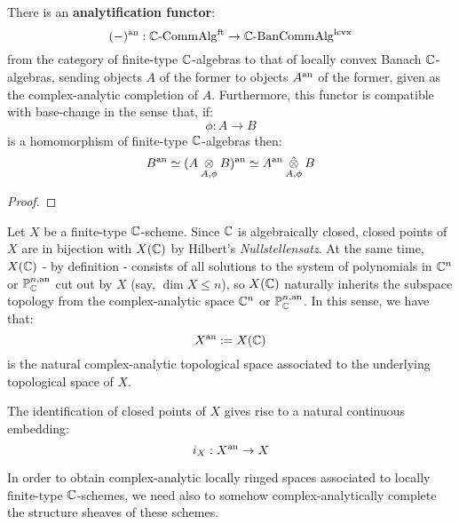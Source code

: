             \begin{lemma} \label{lemma: complex_analytic_completions_of_finite_type_C_algebras}
                There is an \textbf{analytification functor}:
                    $$(-)^{\mathrm{an}}: \mathbb{C}\text{-}\mathrm{Comm}\mathrm{Alg}^{\mathrm{ft}} \to \mathbb{C}\text{-}\mathrm{Ban}\mathrm{Comm}\mathrm{Alg}^{\mathrm{lcvx}}$$
                from the category of finite-type $\mathbb{C}$-algebras to that of locally convex Banach $\mathbb{C}$-algebras, sending objects $A$ of the former to objects $A^{\mathrm{an}}$ of the former, given as the complex-analytic completion of $A$. Furthermore, this functor is compatible with base-change in the sense that, if:
                    $$\phi: A \to B$$
                is a homomorphism of finite-type $\mathbb{C}$-algebras then:
                    $$B^{\an} \cong (A \tensor_{A, \phi} B)^{\an} \cong A^{\an} \hattensor_{A, \phi} B$$
            \end{lemma}
                \begin{proof}
                    
                \end{proof}
            \begin{remark} \label{remark: associated_complex_analytic_topological_spaces}
                Let $X$ be a finite-type $\mathbb{C}$-scheme. Since $\mathbb{C}$ is algebraically closed, closed points of $X$ are in bijection with $X(\mathbb{C})$ by Hilbert's \textit{Nullstellensatz}. At the same time, $X(\mathbb{C})$ - by definition - consists of all solutions to the system of polynomials in $\mathbb{C}^n$ or $\mathbb{P}^{n, \mathrm{an}}_{\mathbb{C}}$ cut out by $X$ (say, $\dim X \leq n$), so $X(\mathbb{C})$ naturally inherits the subspace topology from the complex-analytic space $\mathbb{C}^n$ or $\mathbb{P}^{n, \mathrm{an}}_{\mathbb{C}}$. In this sense, we have that:
                    $$X^{\mathrm{an}} := X(\mathbb{C})$$
                is the natural complex-analytic topological space associated to the underlying topological space of $X$.

                The identification of closed points of $X$ gives rise to a natural continuous embedding:
                    $$i_X: X^{\mathrm{an}} \to X$$
            \end{remark}
            In order to obtain complex-analytic locally ringed spaces associated to locally finite-type $\mathbb{C}$-schemes, we need also to somehow complex-analytically complete the structure sheaves of these schemes. 
